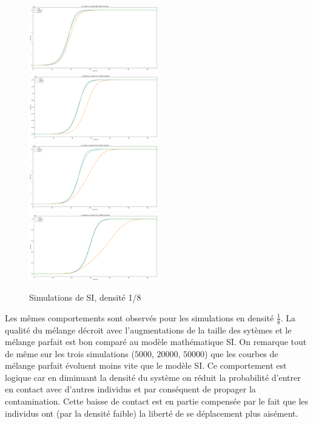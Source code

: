 \begin{figure}
    \centering
    \captionsetup{justification=centering}
    \includegraphics[width=0.5\textwidth]{Images/SI_ref_8_5k.png}
    \includegraphics[width=0.5\textwidth]{Images/SI_ref_8_20k.png}
    \includegraphics[width=0.5\textwidth]{Images/SI_ref_8_50k.png}
    \includegraphics[width=0.5\textwidth]{Images/SI_ref_8_100k.png}
    \caption{Simulations de SI, densité 1/8}
\end{figure}

Les mêmes comportements sont observés pour les simulations en densité $\frac{1}{8}$. La qualité du mélange décroit avec l'augmentations de la taille des sytèmes et le mélange parfait est bon comparé au modèle mathématique SI. On remarque tout de même sur les trois simulations ($5000$, $20000$, $50000$) que les courbes de mélange parfait évoluent moins vite que le modèle SI. Ce comportement est logique car en diminuant la densité du système on réduit la probabilité d'entrer en contact avec d'autres individus et par conséquent de propager la contamination. Cette baisse de contact est en partie compensée par le fait que les individus ont (par la densité faible) la liberté de se déplacement plus aisément.\\

